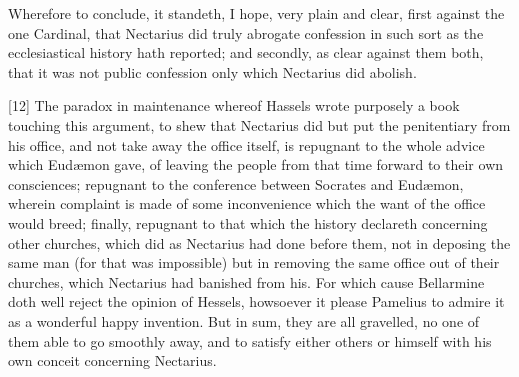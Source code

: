Wherefore to conclude, it standeth, I hope, very plain and clear, first against the one Cardinal, that Nectarius did truly abrogate confession in such sort as the ecclesiastical history hath reported; and secondly, as clear against them both, that it was not public confession only which Nectarius did abolish.

[12] The paradox in maintenance whereof Hassels wrote purposely a book touching this argument, to shew that Nectarius did but put the penitentiary from his office, and not take away the office itself, is repugnant to the whole advice which Eudæmon gave, of leaving the people from that time forward to their own consciences; repugnant to the conference between Socrates and Eudæmon, wherein complaint is made of some inconvenience which the want of the office would breed; finally, repugnant to that which the history declareth concerning other churches, which did as Nectarius had done before them, not in deposing the same man (for that was impossible) but in removing the same office out of their churches, which Nectarius had banished from his. For which cause  Bellarmine doth well reject the opinion of Hessels, howsoever it please Pamelius to admire it as a wonderful happy invention. But in sum, they are all gravelled, no one of them able to go smoothly away, and to satisfy either others or himself with his own conceit concerning Nectarius.


